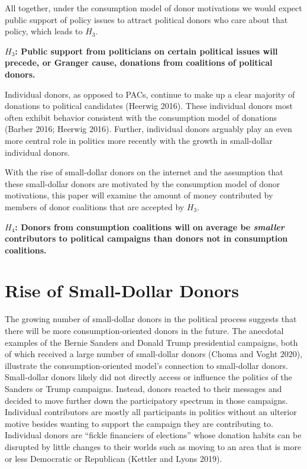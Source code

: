 \documentclass[12pt,]{article}
\begin{document}
All together, under the consumption model of donor motivations we would
expect public support of policy issues to attract political donors who
care about that policy, which leads to \(H_{3}\).

\textbf{\(H_{3}\): Public support from politicians on certain political
issues will precede, or Granger cause, donations from coalitions of
political donors.}

Individual donors, as opposed to PACs, continue to make up a clear
majority of donations to political candidates (Heerwig 2016). These
individual donors most often exhibit behavior consistent with the
consumption model of donations (Barber 2016; Heerwig 2016). Further,
individual donors arguably play an even more central role in politics
more recently with the growth in small-dollar individual donors.

With the rise of small-dollar donors on the internet and the assumption
that these small-dollar donors are motivated by the consumption model of
donor motivations, this paper will examine the amount of money
contributed by members of donor coalitions that are accepted by
\(H_{3}\).

\textbf{\(H_{4}\): Donors from consumption coalitions will on average be
\emph{smaller} contributors to political campaigns than donors not in
consumption coalitions.}

\hypertarget{rise-of-small-dollar-donors}{%
\section{Rise of Small-Dollar
Donors}\label{rise-of-small-dollar-donors}}

The growing number of small-dollar donors in the political process
suggests that there will be more consumption-oriented donors in the
future. The anecdotal examples of the Bernie Sanders and Donald Trump
presidential campaigns, both of which received a large number of
small-dollar donors (Choma and Voght 2020), illustrate the
consumption-oriented model's connection to small-dollar donors.
Small-dollar donors likely did not directly access or influence the
politics of the Sanders or Trump campaigns. Instead, donors reacted to
their messages and decided to move further down the participatory
spectrum in those campaigns. Individual contributors are mostly all
participants in politics without an ulterior motive besides wanting to
support the campaign they are contributing to. Individual donors are
``fickle financiers of elections'' whose donation habits can be
disrupted by little changes to their worlds such as moving to an area
that is more or less Democratic or Republican (Kettler and Lyons 2019).
\end{document}
